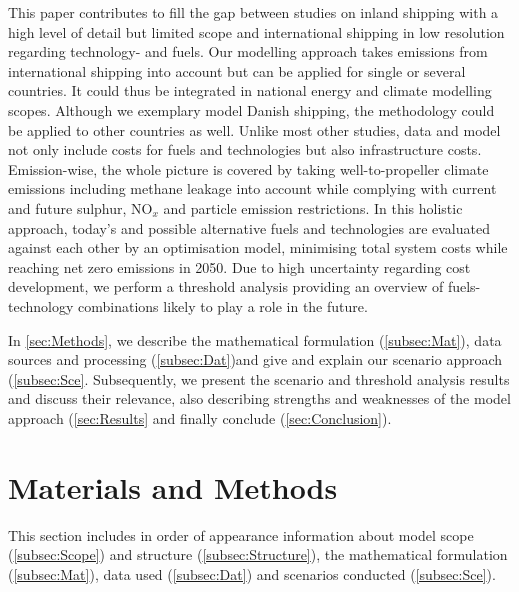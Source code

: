 \documentclass[article]{elsarticle}
\begin{document}
This paper contributes to fill the gap between studies on inland shipping  with a high level of detail but limited scope and international shipping in low resolution regarding technology- and fuels. Our modelling approach takes emissions from international shipping into account but can be applied for single or several countries. It could thus be integrated in national energy and climate modelling scopes. Although we exemplary model Danish shipping, the methodology could be applied to other countries as well.
Unlike most other studies, data and model not only include costs for fuels and technologies but also infrastructure costs. Emission-wise, the whole picture is covered by taking well-to-propeller climate emissions including methane leakage into account while complying with current and future sulphur, NO$_x$ and particle emission restrictions.
In this holistic approach, today's and possible alternative fuels and technologies are evaluated against each other by an optimisation model, minimising total system costs while reaching net zero emissions in 2050. Due to high uncertainty regarding cost development, we perform a threshold analysis providing an overview of fuels-technology combinations likely to play a role in the future.

In \autoref{sec:Methods}, we describe the mathematical formulation (\autoref{subsec:Mat}), data sources and processing (\autoref{subsec:Dat})and give and explain our scenario approach (\autoref{subsec:Sce}. Subsequently, we present the scenario and threshold analysis results and discuss their relevance, also describing strengths and weaknesses of the model approach (\autoref{sec:Results} and finally conclude (\autoref{sec:Conclusion}).  

\section{Materials and Methods}
\label{sec:Methods}

This section includes in order of appearance information about model scope (\cref{subsec:Scope}) and structure (\cref{subsec:Structure}), the mathematical formulation (\cref{subsec:Mat}), data used (\cref{subsec:Dat}) and scenarios conducted (\cref{subsec:Sce}).
\end{document}
